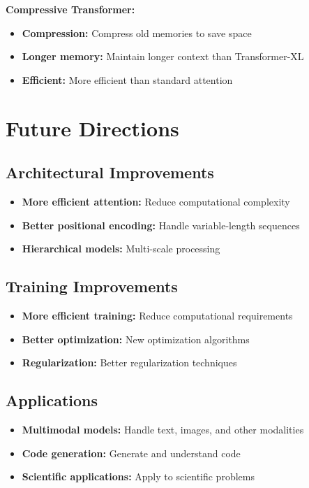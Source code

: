 \textbf{Compressive Transformer:}
\begin{itemize}
    \item \textbf{Compression:} Compress old memories to save space
    \item \textbf{Longer memory:} Maintain longer context than Transformer-XL
    \item \textbf{Efficient:} More efficient than standard attention
\end{itemize}

\section{Future Directions}

\subsection{Architectural Improvements}

\begin{itemize}
    \item \textbf{More efficient attention:} Reduce computational complexity
    \item \textbf{Better positional encoding:} Handle variable-length sequences
    \item \textbf{Hierarchical models:} Multi-scale processing
\end{itemize}

\subsection{Training Improvements}

\begin{itemize}
    \item \textbf{More efficient training:} Reduce computational requirements
    \item \textbf{Better optimization:} New optimization algorithms
    \item \textbf{Regularization:} Better regularization techniques
\end{itemize}

\subsection{Applications}

\begin{itemize}
    \item \textbf{Multimodal models:} Handle text, images, and other modalities
    \item \textbf{Code generation:} Generate and understand code
    \item \textbf{Scientific applications:} Apply to scientific problems
\end{itemize}

